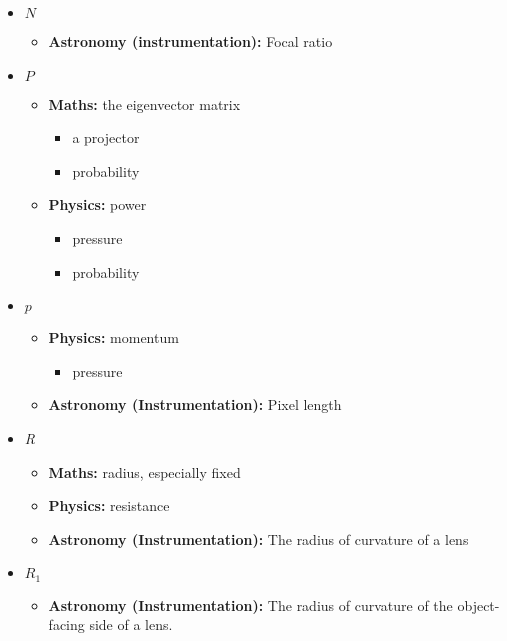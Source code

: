 \begin{itemize}
				\item $N$
				\begin{itemize}
					\item\textbf{Astronomy (instrumentation):} Focal ratio
				\end{itemize}
				
				\item $P$
				\begin{itemize}
					\item\textbf{Maths:} the eigenvector matrix
					\begin{itemize}
						\item a projector
						\item probability
					\end{itemize}
					\item\textbf{Physics:} power
					\begin{itemize}
                    	\item pressure
						\item probability
					\end{itemize}
				\end{itemize}
				
				\item $p$
				\begin{itemize}
					\item\textbf{Physics:} momentum
                    \begin{itemize}
                    	\item pressure
                    \end{itemize}
					\item\textbf{Astronomy (Instrumentation):} Pixel length
				\end{itemize}
				
				\item \textit{R}
				\begin{itemize}
					\item\textbf{Maths:} radius, especially fixed
					\item\textbf{Physics:} resistance
					\item\textbf{Astronomy (Instrumentation):} The radius of curvature of a lens
				\end{itemize}
				
				\item $R_1$
				\begin{itemize}
					\item\textbf{Astronomy (Instrumentation):} The radius of curvature of the object-facing side of a lens.
				\end{itemize}
				

\end{itemize}
